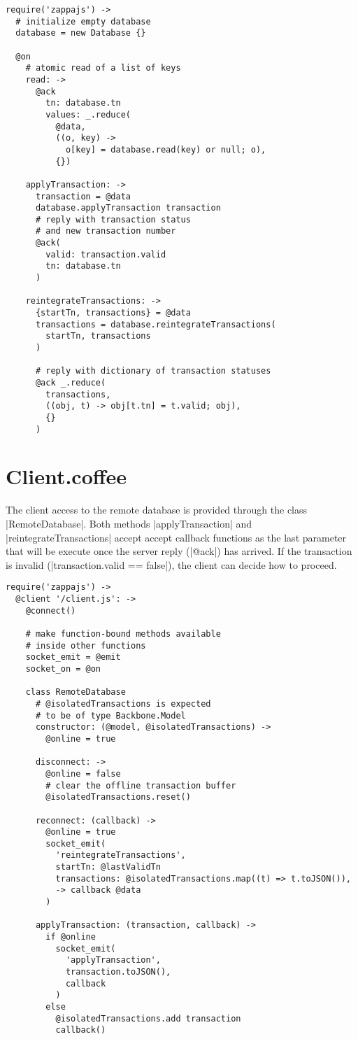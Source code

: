 \begin{verbatim}
require('zappajs') ->
  # initialize empty database
  database = new Database {}

  @on
    # atomic read of a list of keys
    read: ->
      @ack
        tn: database.tn
        values: _.reduce(
          @data,
          ((o, key) ->
            o[key] = database.read(key) or null; o),
          {})

    applyTransaction: ->
      transaction = @data
      database.applyTransaction transaction
      # reply with transaction status
      # and new transaction number
      @ack(
        valid: transaction.valid
        tn: database.tn
      )

    reintegrateTransactions: ->
      {startTn, transactions} = @data
      transactions = database.reintegrateTransactions(
        startTn, transactions
      )

      # reply with dictionary of transaction statuses
      @ack _.reduce(
        transactions,
        ((obj, t) -> obj[t.tn] = t.valid; obj),
        {}
      )
\end{verbatim}



\pagebreak

\section{Client.coffee}

The client access to the remote database is provided through the class
|RemoteDatabase|. Both methods |applyTransaction| and |reintegrateTransactions|
accept accept callback functions as the last parameter that will be execute once
the server reply (|@ack|) has arrived. If the transaction is invalid
(|transaction.valid == false|), the client can decide how to proceed.

\begin{verbatim}
require('zappajs') ->
  @client '/client.js': ->
    @connect()

    # make function-bound methods available
    # inside other functions
    socket_emit = @emit
    socket_on = @on

    class RemoteDatabase
      # @isolatedTransactions is expected
      # to be of type Backbone.Model
      constructor: (@model, @isolatedTransactions) ->
        @online = true

      disconnect: ->
        @online = false
        # clear the offline transaction buffer
        @isolatedTransactions.reset()

      reconnect: (callback) ->
        @online = true
        socket_emit(
          'reintegrateTransactions',
          startTn: @lastValidTn
          transactions: @isolatedTransactions.map((t) => t.toJSON()),
          -> callback @data
        )

      applyTransaction: (transaction, callback) ->
        if @online
          socket_emit(
            'applyTransaction',
            transaction.toJSON(),
            callback
          )
        else
          @isolatedTransactions.add transaction
          callback()
\end{verbatim}
